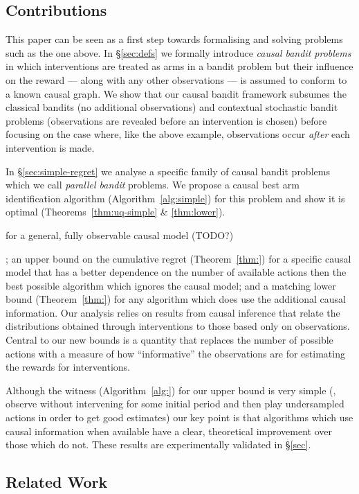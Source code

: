 \subsection{Contributions}

This paper can be seen as a first step towards formalising and solving problems such as the one above. 
In \S\ref{sec:defs} we formally introduce \emph{causal bandit problems} in which interventions are treated as arms in a bandit problem but their influence on the reward --- along with any other observations --- is assumed to conform to a known causal graph. 
We show that our causal bandit framework subsumes the classical bandits (no additional observations) and contextual stochastic bandit problems (observations are revealed before an intervention is chosen) before focusing on the case where, like the above example, observations occur \emph{after} each intervention is made.

In \S\ref{sec:simple-regret} we analyse a specific family of causal bandit problems which we call \emph{parallel bandit} problems.
We propose a causal best arm identification algorithm (Algorithm~\ref{alg:simple}) for this problem and show it is optimal (Theorems~\ref{thm:uq-simple} \& \ref{thm:lower}). 


for a general, fully observable causal model (TODO?)

; an upper bound on the cumulative regret (Theorem~\ref{thm:}) for a specific causal model that has a better dependence on the number of available actions then the best possible algorithm which ignores the causal model; and a matching lower bound (Theorem~\ref{thm:}) for any algorithm which does use the additional causal information.
Our analysis relies on results from causal inference that relate the distributions obtained through interventions to those based only on observations.
Central to our new bounds is a quantity that replaces the number of possible actions with a measure of how ``informative'' the observations are for estimating the rewards for interventions.

Although the witness (Algorithm~\ref{alg:}) for our upper bound is very simple (\ie, observe without intervening for some initial period and then play undersampled actions in order to get good estimates) our key point is that algorithms which use causal information when available have a clear, theoretical improvement over those which do not.
These results are experimentally validated in \S\ref{sec}.


\subsection{Related Work}

